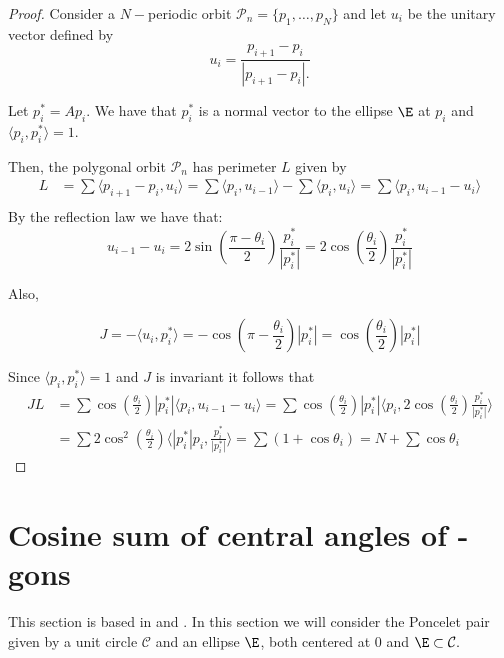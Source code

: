 \begin{proof} Consider a $N-$periodic orbit $\mathcal{P}_n=\{p_1,\ldots, p_N\}$ and let $u_i$ be the unitary vector defined by 
\[u_i=\frac{p_{i+1}-p_i}{|p_{i+1}-p_i|.}\]

Let $p_i^*=Ap_i$. We have that $p_i^*$ is a normal vector to the ellipse $\E$ at $p_i$ and $\langle p_i,p_i^*\rangle=1.$

Then, the polygonal orbit $\mathcal{P}_n$ has perimeter $L$ given by 
\begin{align*}
    L&= \sum \langle p_{i+1}-p_i, u_i\rangle=\sum \langle p_{i} , u_{i-1}\rangle-\sum \langle  p_i, u_i\rangle=\sum \langle p_i, u_{i-1}-u_{i}\rangle\\
\end{align*}
By the reflection law we have that:
\[u_{i-1}-u_i=2\sin\left(\frac{\pi-\theta_i}{2}\right)\frac{p_i^*}{|p_i^*|}=2\cos\left(\frac{\theta_i}{2}\right)\frac{p_i^*}{|p_i^*|}\]

Also,

\[J=-\langle u_i,p_i^* \rangle=-\cos\left(\pi-\frac{\theta_i}{2}\right)|p_i^*|=\cos\left(\frac{\theta_i}{2}\right)|p_i^*|\]

Since $\langle p_i,p_i^*\rangle=1$ and $J$ is invariant it follows that
\begin{align*}
JL&=\sum \cos\left(\frac{\theta_i}{2}\right)|p_i^*|\langle p_i, u_{i-1}-u_{i}\rangle=
\sum \cos\left(\frac{\theta_i}{2}\right)|p_i^*|\langle p_i,2\cos\left(\frac{\theta_i}{2}\right)\frac{p_i^*}{|p_i^*|}\rangle\\
&=\sum 2\cos^2\left( \frac{\theta_i}{2}\right)\langle |p_i^*|p_i, \frac{p_i^*}{|p_i^*|}\rangle=\sum (1+\cos\theta_i)= N+\sum\cos\theta_i
%
\end{align*}
\end{proof}


 \section{  Cosine sum of central angles of -gons }
 
This section is based in \cite{akopyan2020-invariants} and
\cite{bialy2020-invariants}. 
In this section we will consider the Poncelet pair given by a unit circle $\mathcal{C}$ and an ellipse $\E$, both centered at $0$ and 
$\E\subset \mathcal{C}.$


